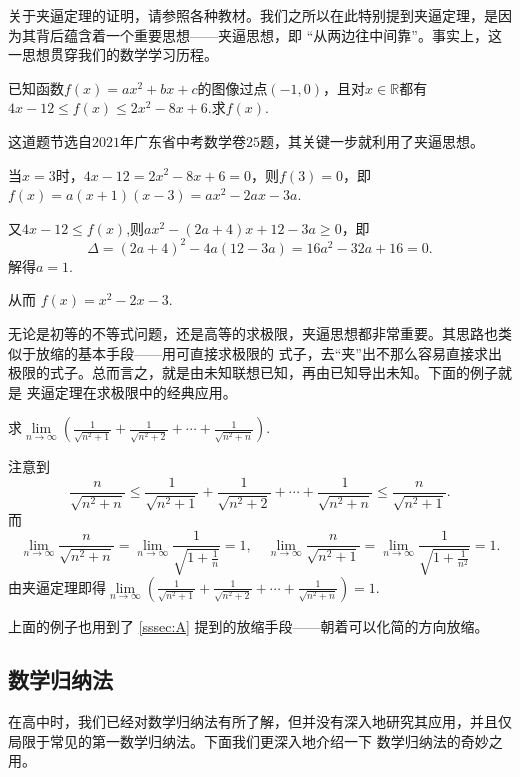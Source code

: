 关于夹逼定理的证明，请参照各种教材。我们之所以在此特别提到夹逼定理，是因为其背后蕴含着一个重要思想——夹逼思想，即
“从两边往中间靠”。事实上，这一思想贯穿我们的数学学习历程。
\begin{example}
    已知函数$f(x)=ax^2+bx+c$的图像过点$(-1,0)$，且对$x\in \mathbb{R}$都有$4x-12\leqslant f(x)\leqslant 2x^2-8x+6$.求$f(x)$.
\end{example}
\begin{solve}
    这道题节选自$2021$年广东省中考数学卷$25$题，其关键一步就利用了夹逼思想。


    当$x=3$时，$4x-12=2x^2-8x+6=0$，则$f(3)=0$，即$f(x)=a(x+1)(x-3)=ax^2-2ax-3a$.


    又$4x-12\leqslant f(x)$,则$ax^2-(2a+4)x+12-3a\geqslant 0$，即
    \[
        \Delta = (2a+4)^2-4a(12-3a)=16a^2-32a+16=0
        .\]
    解得$a=1$.


    从而 $f(x)=x^2-2x-3$.
\end{solve}
无论是初等的不等式问题，还是高等的求极限，夹逼思想都非常重要。其思路也类似于放缩的基本手段——用可直接求极限的
式子，去“夹”出不那么容易直接求出极限的式子。总而言之，就是由未知联想已知，再由已知导出未知。下面的例子就是
夹逼定理在求极限中的经典应用。
\begin{example}
    求$\lim\limits_{n \to \infty}\left( \frac{1}{\sqrt{n^2+1}}+\frac{1}{\sqrt{n^2+2}}+\cdots +\frac{1}{\sqrt{n^2+n}} \right) .$
\end{example}
\begin{solve}
    注意到
    \[
        \frac{n}{\sqrt{n^2+n}}\leqslant \frac{1}{\sqrt{n^2+1}}+\frac{1}{\sqrt{n^2+2}}+\cdots +\frac{1}{\sqrt{n^2+n}}
        \leqslant \frac{n}{\sqrt{n^2+1}}
        .\]
    而
    \[
        \lim\limits_{n \to \infty}\frac{n}{\sqrt{n^2+n}}=\lim\limits_{n \to \infty}\frac{1}{\sqrt{1+\frac{1}{n}}}=1,\quad
        \lim\limits_{n \to \infty}\frac{n}{\sqrt{n^2+1}}=\lim\limits_{n \to \infty}\frac{1}{\sqrt{1+\frac{1}{n^2}}}=1
        .\]
    由夹逼定理即得$\lim\limits_{n \to \infty}\left( \frac{1}{\sqrt{n^2+1}}+\frac{1}{\sqrt{n^2+2}}+\cdots +\frac{1}{\sqrt{n^2+n}} \right) =1$.
\end{solve}
上面的例子也用到了 \autoref{sssec:A} 提到的放缩手段——朝着可以化简的方向放缩。
\subsection{数学归纳法}
在高中时，我们已经对数学归纳法有所了解，但并没有深入地研究其应用，并且仅局限于常见的第一数学归纳法。下面我们更深入地介绍一下
数学归纳法的奇妙之用。
